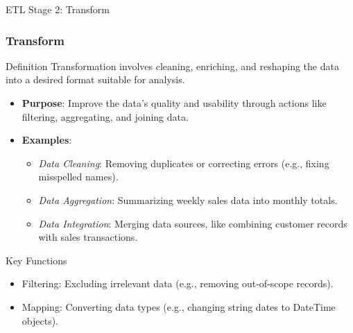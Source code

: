 \documentclass[aspectratio=169]{beamer}
\begin{document}
\begin{frame}[fragile]{ETL Stage 2: Transform}
  \frametitle{Transform}

  \begin{block}{Definition}
    Transformation involves cleaning, enriching, and reshaping the data into a desired format suitable for analysis.
  \end{block}

  \begin{itemize}
    \item \textbf{Purpose}: Improve the data’s quality and usability through actions like filtering, aggregating, and joining data.
    \item \textbf{Examples}:
      \begin{itemize}
        \item \textit{Data Cleaning}: Removing duplicates or correcting errors (e.g., fixing misspelled names).
        \item \textit{Data Aggregation}: Summarizing weekly sales data into monthly totals.
        \item \textit{Data Integration}: Merging data sources, like combining customer records with sales transactions.
      \end{itemize}
  \end{itemize}

  \begin{block}{Key Functions}
    \begin{itemize}
      \item Filtering: Excluding irrelevant data (e.g., removing out-of-scope records).
      \item Mapping: Converting data types (e.g., changing string dates to DateTime objects).
    \end{itemize}
  \end{block}
\end{frame}
\end{document}
